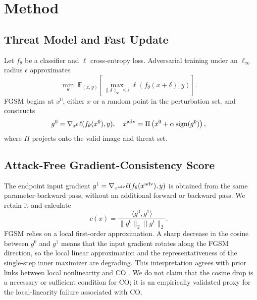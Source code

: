 \section{Method}
\subsection{Threat Model and Fast Update}
Let $f_\theta$ be a classifier and $\ell$ cross-entropy loss. Adversarial
training under an $\ell_\infty$ radius $\epsilon$ approximates
\begin{equation}
\min_\theta\;\mathbb{E}_{(x,y)}
\left[\max_{\|\delta\|_\infty\leq\epsilon}
\ell(f_\theta(x+\delta),y)\right].
\end{equation}
FGSM begins at $x^0$, either $x$ or a random point in the perturbation set,
and constructs
\begin{equation}
g^0=\nabla_{x^0}\ell(f_\theta(x^0),y),\quad
x^{\rm adv}=\Pi\left(x^0+\alpha\,\mathrm{sign}(g^0)\right),
\end{equation}
where $\Pi$ projects onto the valid image and threat set.

\subsection{Attack-Free Gradient-Consistency Score}
The endpoint input gradient
$g^1=\nabla_{x^{\rm adv}}\ell(f_\theta(x^{\rm adv}),y)$ is obtained from the
same parameter-backward pass, without an additional forward or backward pass.
We retain it and calculate
\begin{equation}
c(x)=\frac{\langle g^0,g^1\rangle}
{\|g^0\|_2\|g^1\|_2}.
\end{equation}
FGSM relies on a local first-order approximation. A sharp decrease in the
cosine between $g^0$ and $g^1$ means that the input gradient rotates along the
FGSM direction, so the local linear approximation and the representativeness
of the single-step inner maximizer are degrading. This interpretation agrees
with prior links between local nonlinearity and CO
\cite{andriushchenko2020understanding}. We do not claim that the cosine drop is
a necessary or sufficient condition for CO; it is an empirically validated
proxy for the local-linearity failure associated with CO.

